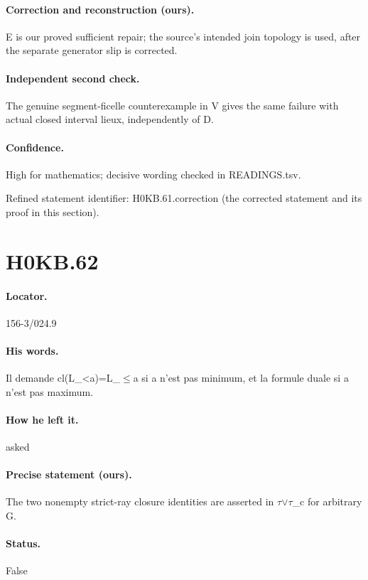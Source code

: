 \paragraph{Correction and reconstruction (ours).} E is our proved sufficient repair; the source’s intended join topology is used, after the separate generator slip is corrected.

\paragraph{Independent second check.} The genuine segment-ficelle counterexample in V gives the same failure with actual closed interval lieux, independently of D.

\paragraph{Confidence.} High for mathematics; decisive wording checked in READINGS.tsv.

\noindent Refined statement identifier: H0KB.61.correction (the corrected statement and its proof in this section).

\section*{H0KB.62}\label{statement:H0KB.62}
\paragraph{Locator.} 156-3/024.9

\paragraph{His words.} Il demande cl(L\_<a)=L\_\ensuremath{\leq}a si a n’est pas minimum, et la formule duale si a n’est pas maximum.

\paragraph{How he left it.} asked

\paragraph{Precise statement (ours).} The two nonempty strict-ray closure identities are asserted in \ensuremath{\tau}\ensuremath{\vee}\ensuremath{\tau}\_c for arbitrary G.

\paragraph{Status.} False

